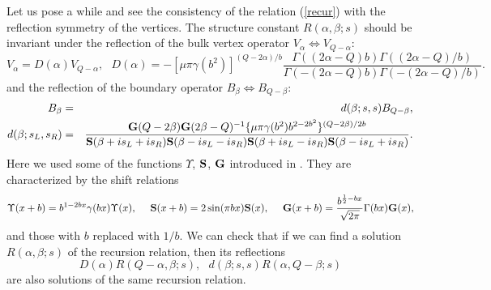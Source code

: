 \documentclass[a4paper,11pt]{article}
\newcommand{\bS}{{\bf S}}
\newcommand{\bG}{{\bf G}}
\begin{document}
   Let us pose a while and see the consistency of the relation
 (\ref{recur}) with the reflection symmetry of the vertices.
 The structure constant $R(\alpha,\beta;s)$ should be invariant
 under the reflection of the bulk vertex operator
 $V_\alpha \Leftrightarrow V_{Q-\alpha}$:
\begin{equation}
 V_\alpha=D(\alpha)V_{Q-\alpha},~~~
 D(\alpha)= -[\mu\pi\gamma(b^2)]^{(Q-2\alpha)/b}
   \frac{\Gamma((2\alpha-Q)b)\Gamma((2\alpha-Q)/b)}
        {\Gamma(-(2\alpha-Q)b)\Gamma(-(2\alpha-Q)/b)}.
\end{equation}
 and the reflection of the boundary operator
 $B_\beta \Leftrightarrow B_{Q-\beta}$:
\begin{eqnarray}
 B_\beta &=& d(\beta;s,s) B_{Q-\beta},\nonumber \\
 d(\beta;s_L,s_R) &=&
 \frac{\bG(Q-2\beta)\bG(2\beta-Q)^{-1}
       \{\mu\pi\gamma(b^2)b^{2-2b^2}\}^{(Q-2\beta)/2b}}
 {\bS(\beta+is_L+is_R)\bS(\beta-is_L-is_R)
  \bS(\beta+is_L-is_R)\bS(\beta-is_L+is_R)}.
\label{bref}
\end{eqnarray}
 Here we used some of the functions $\Upsilon$, $\bS$,
 $\bG$ introduced in \cite{DO, ZZ2, FZZ}.
 They are characterized by the shift relations
\begin{equation}
  \Upsilon(x+b)=b^{1-2bx}\gamma(bx)\Upsilon(x),~~~~
  \bS(x+b)=2\sin(\pi bx)\bS(x), ~~~~
  \bG(x+b)=\frac{b^{\frac{1}{2}-bx}}{\sqrt{2\pi}}\Gamma(bx)\bG(x),
\end{equation}
 and those with $b$ replaced with $1/b$.
 We can check that if we can find a solution $R(\alpha,\beta;s)$ of
 the recursion relation, then its reflections
\begin{equation}
  D(\alpha)R(Q-\alpha,\beta;s),~~~
  d(\beta;s,s)R(\alpha,Q-\beta;s)
\end{equation}
 are also solutions of the same recursion relation.
\end{document}
